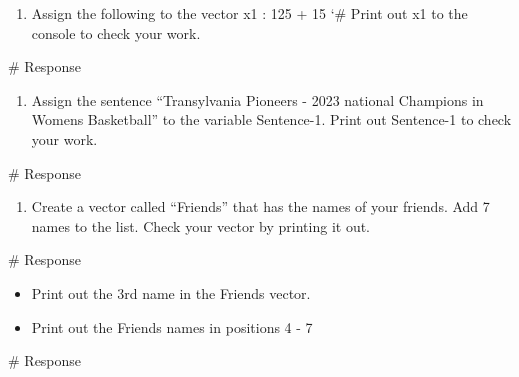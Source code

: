 \documentclass[
  letterpaper,
  DIV=11,
  numbers=noendperiod]{scrreprt}
\newenvironment{Shaded}{\begin{snugshade}}{\end{snugshade}}
\newcommand{\CommentTok}[1]{\textcolor[rgb]{0.37,0.37,0.37}{#1}}
\providecommand{\tightlist}{%
  \setlength{\itemsep}{0pt}\setlength{\parskip}{0pt}}\usepackage{longtable,booktabs,array}
\begin{document}
\begin{enumerate}
\def\labelenumi{\arabic{enumi}.}
\setcounter{enumi}{1}
\tightlist
\item
  Assign the following to the vector x1 : 125 + 15 `\# Print out x1 to
  the console to check your work.
\end{enumerate}

\begin{Shaded}
\begin{Highlighting}[]
\CommentTok{\# Response}
\end{Highlighting}
\end{Shaded}

\begin{enumerate}
\def\labelenumi{\arabic{enumi}.}
\setcounter{enumi}{2}
\tightlist
\item
  Assign the sentence ``Transylvania Pioneers - 2023 national Champions
  in Womens Basketball'' to the variable Sentence-1. Print out
  Sentence-1 to check your work.
\end{enumerate}

\begin{Shaded}
\begin{Highlighting}[]
\CommentTok{\# Response}
\end{Highlighting}
\end{Shaded}

\begin{enumerate}
\def\labelenumi{\arabic{enumi}.}
\setcounter{enumi}{3}
\tightlist
\item
  Create a vector called ``Friends'' that has the names of your friends.
  Add 7 names to the list. Check your vector by printing it out.
\end{enumerate}

\begin{Shaded}
\begin{Highlighting}[]
\CommentTok{\# Response}
\end{Highlighting}
\end{Shaded}

\begin{itemize}
\tightlist
\item
  Print out the 3rd name in the Friends vector.
\item
  Print out the Friends names in positions 4 - 7
\end{itemize}

\begin{Shaded}
\begin{Highlighting}[]
\CommentTok{\# Response}
\end{Highlighting}
\end{Shaded}
\end{document}
